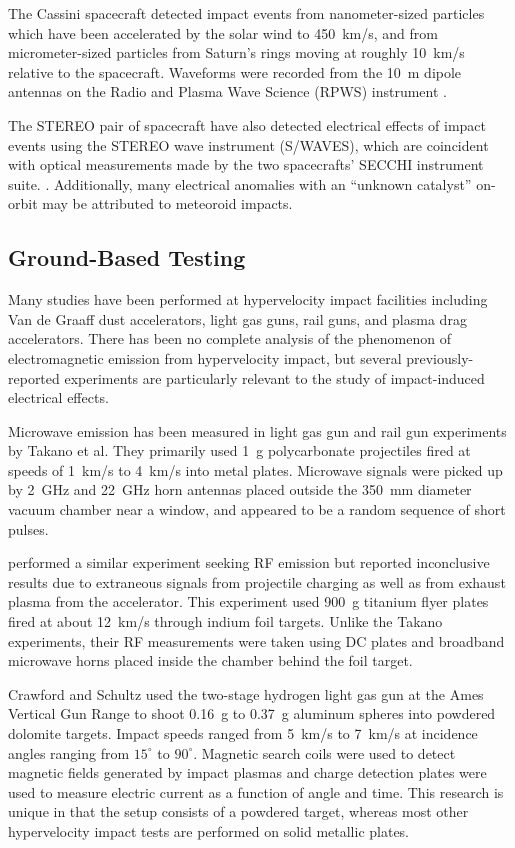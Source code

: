 The Cassini spacecraft detected impact events from nanometer-sized particles which have been accelerated by the solar wind to 450~km/s, and from micrometer-sized particles from Saturn's rings moving at roughly 10~km/s relative to the spacecraft.  Waveforms were recorded from the 10~m dipole antennas on the Radio and Plasma Wave Science (RPWS) instrument \cite{Kurth2005, Meyer-Vernet2009a}.

The STEREO pair of spacecraft have also detected electrical effects of impact events using the STEREO wave instrument (S/WAVES), which are coincident with optical measurements made by the two spacecrafts' SECCHI instrument suite. \cite{Meyer-Vernet2009b, St.Cyr2009}.  Additionally, many electrical anomalies with an ``unknown catalyst'' on-orbit may be attributed to meteoroid impacts.

\subsection{Ground-Based Testing}
Many studies have been performed at hypervelocity impact facilities including Van de Graaff dust accelerators, light gas guns, rail guns, and plasma drag accelerators.  There has been no complete analysis of the phenomenon of electromagnetic emission from hypervelocity impact, but several previously-reported experiments are particularly relevant to the study of impact-induced electrical effects.

Microwave emission has been measured in light gas gun and rail gun experiments by Takano et al. \cite{Takano2002,Maki2004,Ohnishi2005,Ohnishi2007}  They primarily used 1~g polycarbonate projectiles fired at speeds of 1~km/s to 4~km/s into metal plates.  Microwave signals were picked up by 2~GHz and 22~GHz horn antennas placed outside the 350~mm diameter vacuum chamber near a window, and appeared to be a random sequence of short pulses.

\citet{Starks2006} performed a similar experiment seeking RF emission but reported inconclusive results due to extraneous signals from projectile charging as well as from exhaust plasma from the accelerator.  This experiment used 900~g titanium flyer plates fired at about 12~km/s through indium foil targets.  Unlike the Takano experiments, their RF measurements were taken using DC plates and broadband microwave horns placed inside the chamber behind the foil target.

Crawford and Schultz \cite{Crawford1993,Crawford1999} used the two-stage hydrogen light gas gun at the Ames Vertical Gun Range to shoot 0.16~g to 0.37~g aluminum spheres into powdered dolomite targets.  Impact speeds ranged from 5~km/s to 7~km/s at incidence angles ranging from $15^\circ$ to $90^\circ$.  Magnetic search coils were used to detect magnetic fields generated by impact plasmas and charge detection plates were used to measure electric current as a function of angle and time.  This research is unique in that the setup consists of a powdered target, whereas most other hypervelocity impact tests are performed on solid metallic plates.

